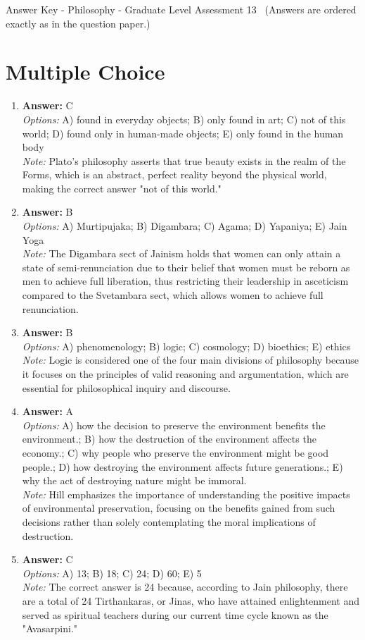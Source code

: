 \documentclass[12pt]{article}
\begin{document}
\begin{center}
Answer Key - Philosophy - Graduate Level Assessment 13 \
\small (Answers are ordered exactly as in the question paper.)
\end{center}

\section*{Multiple Choice}
\begin{enumerate}[label=\arabic*.]
\item \textbf{Answer:} C
\\ \textit{Options:} A) found in everyday objects; B) only found in art; C) not of this world; D) found only in human-made objects; E) only found in the human body
\\ \textit{Note:} Plato's philosophy asserts that true beauty exists in the realm of the Forms, which is an abstract, perfect reality beyond the physical world, making the correct answer "not of this world."
\item \textbf{Answer:} B
\\ \textit{Options:} A) Murtipujaka; B) Digambara; C) Agama; D) Yapaniya; E) Jain Yoga
\\ \textit{Note:} The Digambara sect of Jainism holds that women can only attain a state of semi-renunciation due to their belief that women must be reborn as men to achieve full liberation, thus restricting their leadership in asceticism compared to the Svetambara sect, which allows women to achieve full renunciation.
\item \textbf{Answer:} B
\\ \textit{Options:} A) phenomenology; B) logic; C) cosmology; D) bioethics; E) ethics
\\ \textit{Note:} Logic is considered one of the four main divisions of philosophy because it focuses on the principles of valid reasoning and argumentation, which are essential for philosophical inquiry and discourse.
\item \textbf{Answer:} A
\\ \textit{Options:} A) how the decision to preserve the environment benefits the environment.; B) how the destruction of the environment affects the economy.; C) why people who preserve the environment might be good people.; D) how destroying the environment affects future generations.; E) why the act of destroying nature might be immoral.
\\ \textit{Note:} Hill emphasizes the importance of understanding the positive impacts of environmental preservation, focusing on the benefits gained from such decisions rather than solely contemplating the moral implications of destruction.
\item \textbf{Answer:} C
\\ \textit{Options:} A) 13; B) 18; C) 24; D) 60; E) 5
\\ \textit{Note:} The correct answer is 24 because, according to Jain philosophy, there are a total of 24 Tirthankaras, or Jinas, who have attained enlightenment and served as spiritual teachers during our current time cycle known as the "Avasarpini."
\end{enumerate}
\end{document}
